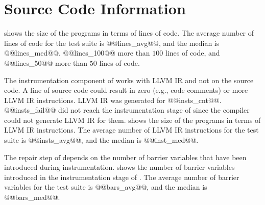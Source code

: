 \section{Source Code Information}
 shows the size of the programs in terms of lines of code. The average number of lines of code for the test suite is @@lines_avg@@, and the median is @@lines_med@@. @@lines_100@@ more than $100$ lines of code, and @@lines_50@@ more than $50$ lines of code.



The instrumentation component of \tool works with LLVM IR and not on the source code. A line of source code could result in zero (e.g., code comments) or more LLVM IR instructions. LLVM IR was generated for @@insts_cnt@@. @@insts_fail@@ did not reach the instrumentation stage of \tool since the compiler could not generate LLVM IR for them.  shows the size of the programs in terms of LLVM IR instructions. The average number of LLVM IR instructions for the test suite is @@insts_avg@@, and the median is @@inst_med@@.



The repair step of \tool depends on the number of barrier variables that have been introduced during instrumentation.  shows the number of barrier variables introduced in the instrumentation stage of \tool. The average number of barrier variables for the test suite is @@bars_avg@@, and the median is @@bars_med@@.
